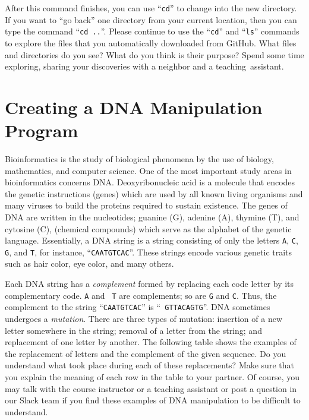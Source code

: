 \documentclass[11pt]{article}
\newcommand{\command}[1]{``\lstinline{#1}''}
\newcommand{\step}[1]{``{#1}''}
\begin{document}
After this command finishes, you can use \command{cd} to change into the new directory. If you want to \step{go back}
one directory from your current location, then you can type the command \command{cd ..}. Please continue to use the
\command{cd} and \command{ls} commands to explore the files that you automatically downloaded from GitHub. What files
and directories do you see? What do you think is their purpose? Spend some time exploring, sharing your discoveries with
a neighbor and a \mbox{teaching assistant}.

\section*{Creating a DNA Manipulation Program}

Bioinformatics is the study of biological phenomena by the use of biology, mathematics, and computer science. One of the
most important study areas in bioinformatics concerns DNA. Deoxyribonucleic acid is a molecule that encodes the
genetic instructions (genes) which are used by all known living organisms and many viruses to build the proteins
required to sustain existence. The genes of DNA are written in the nucleotides; guanine (G), adenine (A), thymine (T),
and cytosine (C), (chemical compounds) which serve as the alphabet of the genetic language.  Essentially, a DNA string
is a string consisting of only the letters {\tt A}, {\tt C}, {\tt G}, and {\tt T}, for instance, ``{\tt CAATGTCAC}''.
These strings encode various genetic traits such as hair color, eye color, and many others.

Each DNA string has a {\em complement} formed by replacing each code letter by its complementary code. {\tt A} and {\tt
T} are complements; so are {\tt G} and {\tt C}. Thus, the complement to the string ``{\tt CAATGTCAC}'' is ``{\tt
GTTACAGTG}''.  DNA sometimes undergoes a {\em mutation}. There are three types of mutation: insertion of a new letter
somewhere in the string; removal of a letter from the string; and replacement of one letter by another. The following
table shows the examples of the replacement of letters and the complement of the given sequence. Do you understand what
took place during each of these replacements? Make sure that you explain the meaning of each row in the table to your
partner. Of course, you may talk with the course instructor or a teaching assistant or post a question in our Slack team
if you find these examples of DNA manipulation to be difficult to understand.
\end{document}
